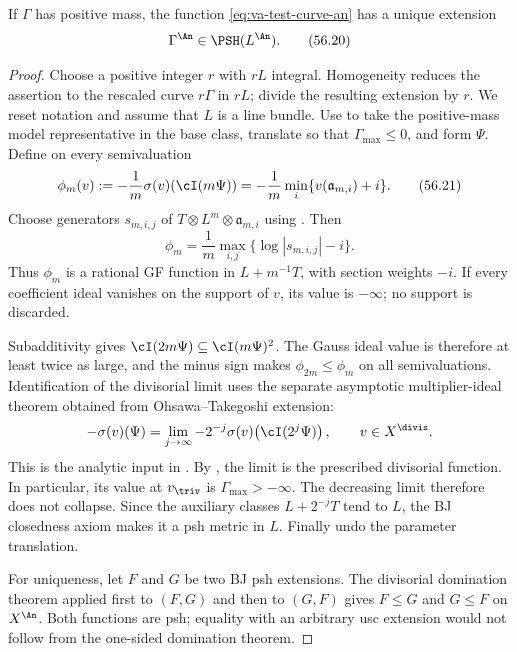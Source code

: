 \begin{theorem}\label{thm:va-positive-mass-metric}
If $\Gamma$ has positive mass, the function
\eqref{eq:va-test-curve-an} has a unique extension
\[
                           \Gamma^{\An}\in\PSH(L^{\An}).
\tag{56.20}\label{eq:va-positive-extension}
\]
\end{theorem}

\begin{proof}
Choose a positive integer $r$ with $rL$ integral. Homogeneity reduces
the assertion to the rescaled curve $r\Gamma$ in $rL$; divide the
resulting extension by $r$. We reset notation and assume that $L$
is a line bundle. Use  to take the positive-mass
model representative in the base class,
translate so that $\Gamma_{\max}\leq0$, and form $\Psi$.
Define on every semivaluation
\[
 \phi_m(v):=-\frac1m\sigma(v)(\cI(m\Psi))
 =-\frac1m\min_i\{v(\mathfrak a_{m,i})+i\}.
\tag{56.21}\label{eq:va-family-gf}
\]
Choose generators $s_{m,i,j}$ of
$T\otimes L^m\otimes\mathfrak a_{m,i}$ using
. Then
\[
          \phi_m=\frac1m\max_{i,j}\{\log|s_{m,i,j}|-i\}.
\tag{56.21a}\label{eq:va-family-section-weights}
\]
Thus $\phi_m$ is a rational GF function in $L+m^{-1}T$, with
section weights $-i$. If every coefficient ideal vanishes on the
support of $v$, its value is $-\infty$; no support is discarded.

Subadditivity gives
$\cI(2m\Psi)\subseteq\cI(m\Psi)^2$.
The Gauss ideal value is therefore at least twice as large, and the
minus sign makes $\phi_{2m}\leq\phi_m$ on all semivaluations.
Identification of the divisorial limit uses the separate asymptotic
multiplier-ideal theorem obtained from Ohsawa--Takegoshi extension:
\[
 -\sigma(v)(\Psi)
 =\lim_{j\to\infty}
   -2^{-j}\sigma(v)\!\left(\cI(2^j\Psi)\right),
                           \qquad v\in X^{\divis}.
\]
This is the analytic input in \cite[Proposition~3.10]{DXZ23}.
By , the limit is the prescribed
divisorial function. In particular, its value at $v_{\triv}$ is
$\Gamma_{\max}>-\infty$. The decreasing limit therefore does not
collapse. Since the auxiliary classes $L+2^{-j}T$ tend to $L$,
the BJ closedness axiom makes it a psh metric in $L$.
Finally undo the parameter translation.

For uniqueness, let $F$ and $G$ be two BJ psh extensions. The
divisorial domination theorem \cite[Theorem~4.22]{BJ22} applied
first to $(F,G)$ and then to $(G,F)$ gives $F\leq G$ and
$G\leq F$ on $X^{\An}$. Both functions are psh; equality with
an arbitrary usc extension would not follow from the one-sided
domination theorem.
\end{proof}

